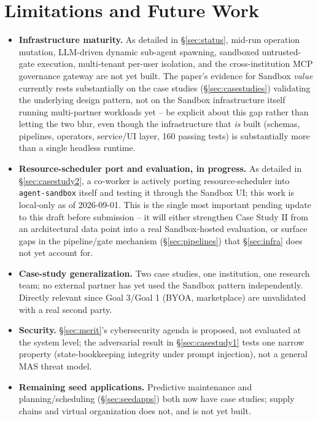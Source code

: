 \documentclass[10pt,conference]{IEEEtran}
\begin{document}
\section{Limitations and Future Work}
\label{sec:limitations}
\begin{itemize}
  \item \textbf{Infrastructure maturity.} As detailed in
  \S\ref{sec:status}, mid-run operation mutation, LLM-driven dynamic
  sub-agent spawning, sandboxed untrusted-gate execution, multi-tenant
  per-user isolation, and the cross-institution MCP governance gateway are
  not yet built. The paper's evidence for Sandbox \emph{value} currently
  rests substantially on the case studies (\S\ref{sec:casestudies})
  validating the underlying design pattern, not on the Sandbox
  infrastructure itself running multi-partner workloads yet -- be explicit
  about this gap rather than letting the two blur, even though the
  infrastructure that \emph{is} built (schemas, pipelines, operators,
  service/UI layer, 160 passing tests) is substantially more than a single
  headless runtime.
  \item \textbf{Resource-scheduler port and evaluation, in progress.} As
  detailed in \S\ref{sec:casestudy2}, a co-worker is actively porting
  resource-scheduler into \texttt{agent-sandbox} itself and testing it
  through the Sandbox UI; this work is local-only as of 2026-09-01. This is
  the single most important pending update to this draft before
  submission -- it will either strengthen Case Study II from an
  architectural data point into a real Sandbox-hosted evaluation, or
  surface gaps in the pipeline/gate mechanism (\S\ref{sec:pipelines}) that
  \S\ref{sec:infra} does not yet account for.
  \item \textbf{Case-study generalization.} Two case studies, one
  institution, one research team; no external partner has yet used the
  Sandbox pattern independently. Directly relevant since Goal 3/Goal 1
  (BYOA, marketplace) are unvalidated with a real second party.
  \item \textbf{Security.} \S\ref{sec:merit}'s cybersecurity agenda is
  proposed, not evaluated at the system level; the adversarial result in
  \S\ref{sec:casestudy1} tests one narrow property (state-bookkeeping
  integrity under prompt injection), not a general MAS threat model.
  \item \textbf{Remaining seed applications.} Predictive maintenance and
  planning/scheduling (\S\ref{sec:seedapps}) both now have case studies;
  supply chains and virtual organization does not, and is not yet built.
\end{itemize}
\end{document}
